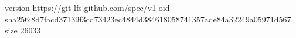 version https://git-lfs.github.com/spec/v1
oid sha256:8d7facd37139f3cd73423ec4844d384618058741357ade84a32249a05971d567
size 26033
